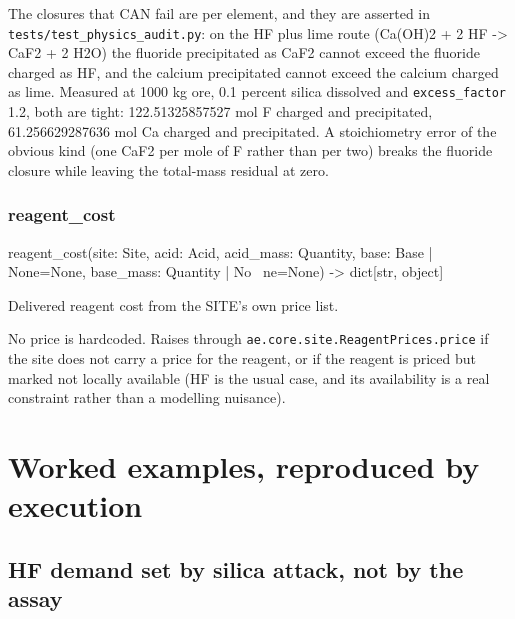 \documentclass[10pt,a4paper,twoside]{report}
\begin{document}
The closures that CAN fail are per element, and they are asserted in \texttt{tests/test\_physics\_audit.py}: on the HF plus lime route (Ca(OH)2 + 2 HF -> CaF2 + 2 H2O) the fluoride precipitated as CaF2 cannot exceed the fluoride charged as HF, and the calcium precipitated cannot exceed the calcium charged as lime. Measured at 1000 kg ore, 0.1 percent silica dissolved and \texttt{excess\_factor} 1.2, both are tight: 122.51325857527 mol F charged and precipitated, 61.256629287636 mol Ca charged and precipitated. A stoichiometry error of the obvious kind (one CaF2 per mole of F rather than per two) breaks the fluoride closure while leaving the total-mass residual at zero.

\subsubsection*{reagent\_cost}

\begin{verbatimsmall}
reagent_cost(site: Site, acid: Acid, acid_mass: Quantity, base: Base | None=None, base_mass: Quantity | No
    \ ne=None) -> dict[str, object]
\end{verbatimsmall}

Delivered reagent cost from the SITE's own price list.

No price is hardcoded. Raises through \texttt{ae.core.site.ReagentPrices.price} if the site does not carry a price for the reagent, or if the reagent is priced but marked not locally available (HF is the usual case, and its availability is a real constraint rather than a modelling nuisance).

\section{Worked examples, reproduced by execution}

\subsection*{HF demand set by silica attack, not by the assay}
\end{document}
